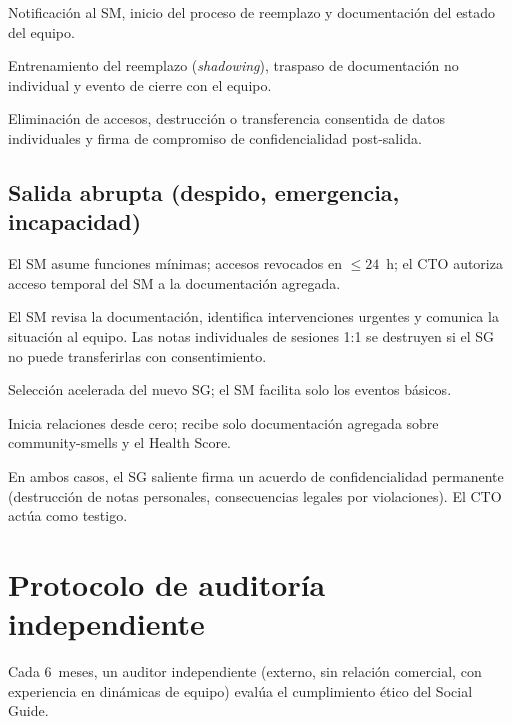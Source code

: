 \begin{description}[nosep, leftmargin=1.2cm, style=nextline]
    \item[Semana~1] Notificación al SM, inicio del proceso de reemplazo y documentación del estado del equipo.
    \item[Semana~2] Entrenamiento del reemplazo (\textit{shadowing}), traspaso de documentación no individual y evento de cierre con el equipo.
    \item[Día final] Eliminación de accesos, destrucción o transferencia consentida de datos individuales y firma de compromiso de confidencialidad post-salida.
\end{description}

\subsection{Salida abrupta (despido, emergencia, incapacidad)}

\begin{description}[nosep, leftmargin=1.2cm, style=nextline]
    \item[Inmediato] El SM asume funciones mínimas; accesos revocados en $\leq 24$~h; el CTO autoriza acceso temporal del SM a la documentación agregada.
    \item[Semana~1] El SM revisa la documentación, identifica intervenciones urgentes y comunica la situación al equipo. Las notas individuales de sesiones 1:1 se destruyen si el SG no puede transferirlas con consentimiento.
    \item[Semanas 2--4] Selección acelerada del nuevo SG; el SM facilita solo los eventos básicos.
    \item[Nuevo SG] Inicia relaciones desde cero; recibe solo documentación agregada sobre \gls{community-smells} y el Health Score.
\end{description}

\noindent En ambos casos, el SG saliente firma un acuerdo de confidencialidad permanente (destrucción de notas personales, consecuencias legales por violaciones). El CTO actúa como testigo.

\section{Protocolo de auditoría independiente}

Cada 6~meses, un auditor independiente (externo, sin relación comercial, con experiencia en dinámicas de equipo) evalúa el cumplimiento ético del Social Guide.


